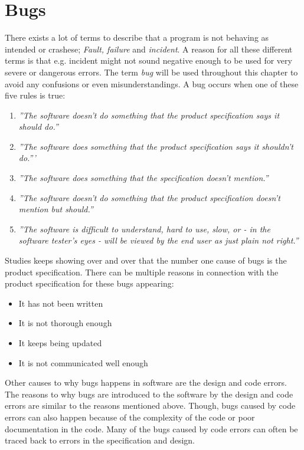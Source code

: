 \section{Bugs}\label{sec:Bug}
There exists a lot of terms to describe that a program is not behaving as intended or crashese; \textit{Fault, failure} and \textit{incident}.
A reason for all these different terms is that e.g. incident might not sound negative enough to be used for very severe or dangerous errors. \cite{SoftwareTesting}
The term \textit{bug} will be used throughout this chapter to avoid any confusions or even misunderstandings.
A bug occurs when one of these five rules is true: \cite{SoftwareTesting} %

\begin{enumerate}
	\item \textit{''The software doesn't do something that the product specification says it should do.''}
	\item \textit{''The software does something that the product specification says it shouldn't do.'''}
	\item \textit{''The software does something that the specification doesn't mention.''}
	\item \textit{''The software doesn't do something that the product specification doesn't mention but should.''}
	\item \textit{''The software is difficult to understand, hard to use, slow, or - in the software tester's eyes - will be viewed by the end user as just plain not right.''}
\end{enumerate}

Studies keeps showing over and over that the number one cause of bugs is the product specification.
There can be multiple reasons in connection with the product specification for these bugs appearing: \cite{SoftwareTesting}

\begin{itemize}
	\item It has not been written
	\item It is not thorough enough
	\item It keeps being updated
	\item It is not communicated well enough
\end{itemize}

Other causes to why bugs happens in software are the design and code errors.
The reasons to why bugs are introduced to the software by the design and code errors are similar to the reasons mentioned above.
Though, bugs caused by code errors can also happen because of the complexity of the code or poor documentation in the code.
Many of the bugs caused by code errors can often be traced back to errors in the specification and design. \cite{SoftwareTesting}

